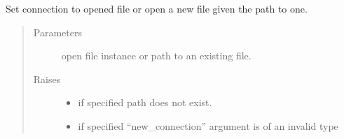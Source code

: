 \documentclass[letterpaper,10pt,english]{sphinxmanual}
\begin{document}
\begin{fulllineitems}
\begin{fulllineitems}
Set connection to opened file or open a new file given the path to
one.
\begin{quote}\begin{description}
\item[{Parameters}] \leavevmode
{} \textendash{} open file instance or path to an existing file.

\item[{Raises}] \leavevmode\begin{itemize}
\item {} 
 \textendash{} if specified path does not exist.

\item {} 
 \textendash{} if specified “new\_connection” argument is of an
    invalid type

\end{itemize}

\end{description}\end{quote}

\end{fulllineitems}


\end{fulllineitems}

\end{document}
